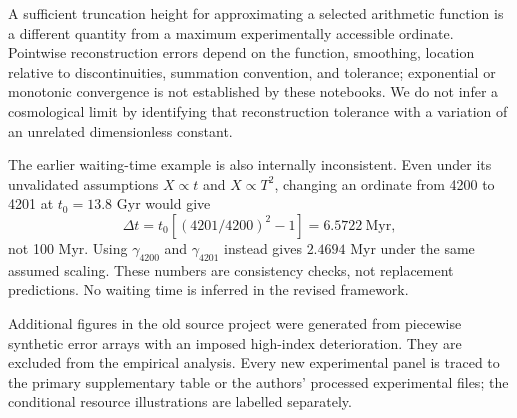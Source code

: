 \documentclass[aps,pra,onecolumn,amsmath,amssymb,nofootinbib,superscriptaddress,floatfix,11pt]{revtex4-2}
\begin{document}
A sufficient truncation height for approximating a selected arithmetic function is a different quantity from a maximum experimentally accessible ordinate. Pointwise reconstruction errors depend on the function, smoothing, location relative to discontinuities, summation convention, and tolerance; exponential or monotonic convergence is not established by these notebooks. We do not infer a cosmological limit by identifying that reconstruction tolerance with a variation of an unrelated dimensionless constant.

The earlier waiting-time example is also internally inconsistent. Even under its unvalidated assumptions $X\propto t$ and $X\propto T^2$, changing an ordinate from 4200 to 4201 at $t_0=13.8$ Gyr would give
\begin{equation}
 \Delta t=t_0[(4201/4200)^2-1]=6.5722\ \mathrm{Myr},
\end{equation}
not 100 Myr. Using $\gamma_{4200}$ and $\gamma_{4201}$ instead gives $2.4694$ Myr under the same assumed scaling. These numbers are consistency checks, not replacement predictions. No waiting time is inferred in the revised framework.

Additional figures in the old source project were generated from piecewise synthetic error arrays with an imposed high-index deterioration. They are excluded from the empirical analysis. Every new experimental panel is traced to the primary supplementary table or the authors' processed experimental files; the conditional resource illustrations are labelled separately.


\end{document}
